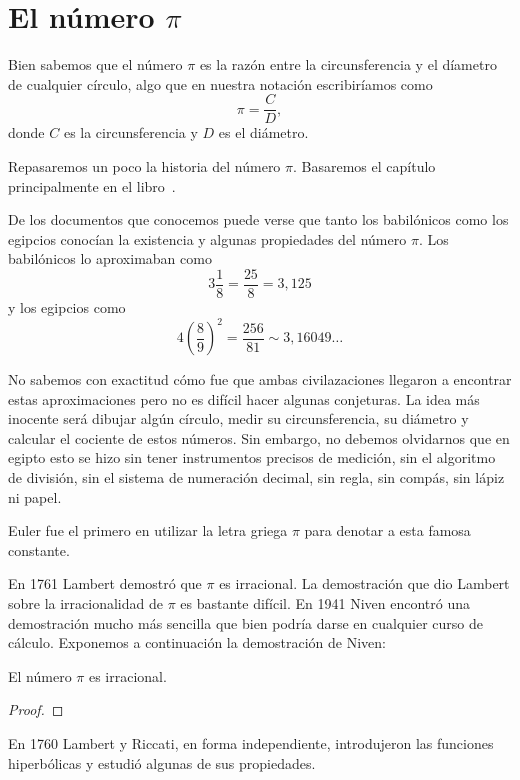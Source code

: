 \chapter{El número $\pi$}

Bien sabemos que el número $\pi$ es la razón entre la circunsferencia y el
díametro de cualquier círculo, algo que en nuestra notación escribiríamos como
\[
	\pi=\frac{C}{D},
\]
donde $C$ es la circunsferencia y $D$ es el diámetro. 

Repasaremos un poco la historia del número $\pi$. Basaremos el capítulo principalmente en el libro~\cite{MR0449960}. 

De los documentos que conocemos puede verse que tanto los babilónicos como los
egipcios conocían la existencia y algunas propiedades del número $\pi$. Los babilónicos lo aproximaban como
\[
	3\frac18=\frac{25}{8}=3,125
\]
y los egipcios como 
\[
	4\left(\frac89\right)^2=\frac{256}{81}\sim 3,16049\dots
\]

No sabemos con exactitud cómo fue que ambas civilazaciones llegaron a encontrar
estas aproximaciones pero no es difícil hacer algunas conjeturas. La idea más
inocente será dibujar algún círculo, medir su circunsferencia, su diámetro y
calcular el cociente de estos números. Sin embargo, no debemos olvidarnos que
en egipto esto se hizo sin tener instrumentos precisos de medición, sin el
algoritmo de división, sin el sistema de numeración decimal, sin regla, sin
compás, sin lápiz ni papel. 

Euler fue el primero en utilizar la letra griega $\pi$ para denotar a esta
famosa constante. 



En 1761 Lambert demostró que $\pi$ es irracional.  La demostración que dio
Lambert sobre la irracionalidad de $\pi$ es bastante difícil. En 1941 Niven
encontró una demostración mucho más sencilla que bien podría darse en cualquier
curso de cálculo. Exponemos a continuación la demostración de Niven:

\begin{theorem}
	El número $\pi$ es irracional.	
\end{theorem}

\begin{proof}
		
\end{proof}

En 1760 Lambert y Riccati, en forma independiente, introdujeron las funciones
hiperbólicas y estudió algunas de sus propiedades. 


